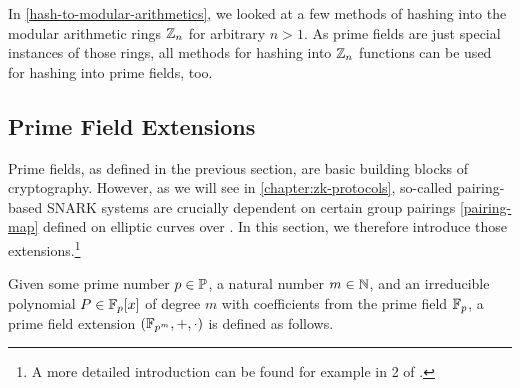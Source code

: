 In \secname{} \ref{hash-to-modular-arithmetics}, we looked at a few methods of hashing into the modular arithmetic rings $\mathbb{Z}_n$ for arbitrary $n>1$. As prime fields are just special instances of those rings, all methods for hashing into $\mathbb{Z}_n$ functions can be used for hashing into prime fields, too.

\begin{comment}
\subsection{MiMC Hash functions} As we will see in XXX, 

To define a MiMC hash function, let $\F_p$ be a prime field with prime modulus $p\in\Prim$, let $n$ be the smallest natural number such that  $gcd(n, p-1) = 1$. Let $r$ be the smallest integer greater than or equal to $\frac{log(p)}{log_2(3)}$ and let $C=\{c_i\in \F_p \;|\; 0\leq i \leq r\}$ be a set of randomly generated field elements. The definition of the MiMC hash function then starts with an invertible map
\begin{equation}
E(\cdot) : \F_p \to \F_p\; x \mapsto F_{r-1}(\cdots F_1(F_0(x))\ldots)
\end{equation}
where $F_i(x)= (x+c_i)^n$
\end{comment}

\subsection{Prime Field Extensions}\label{field-extension}
Prime fields, as defined in the previous section, are basic building blocks of cryptography. However, as we will see in \chaptname{} \ref{chapter:zk-protocols}, so-called pairing-based SNARK systems are crucially dependent on certain group pairings \eqref{pairing-map} defined on elliptic curves over . In this section, we therefore introduce those extensions.\footnote{A more detailed introduction can be found for example in \chaptname{} 2 of \cite{nieder-1986}.}

Given some prime number $p\in \mathbb{P}$, a natural number $m\in\mathbb{N}$, and an irreducible polynomial $P\in \mathbb{F}_p[x]$ of degree $m$ with coefficients from the prime field $\mathbb{F}_p$,  a prime field extension $(\mathbb{F}_{p^m},+,\cdot)$ is defined as follows.

